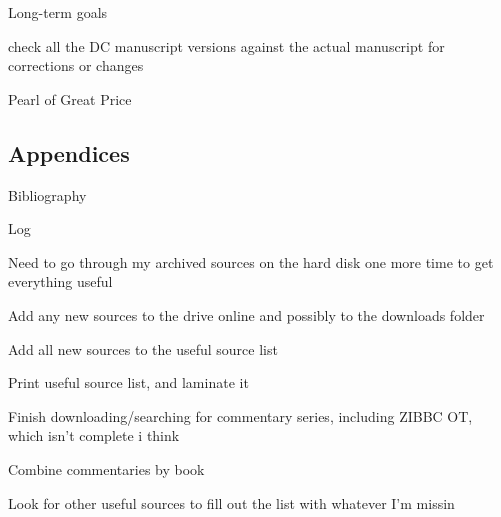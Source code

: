 \begin{compactitem}
\begin{compactitem}
\begin{compactitem}
						\end{compactitem}
				
					\item Long-term goals
						\begin{compactitem}
							\item check all the DC manuscript versions against the actual manuscript for corrections or changes
						\end{compactitem} 
					
				\end{compactitem}
				
			\item Pearl of Great Price
				\begin{compactitem}
					\item 
				\end{compactitem}
			
		\end{compactitem}
		
	\subsection{Appendices}
	
		\begin{compactitem}
		
			\item Bibliography
				\begin{compactitem}
					
					\item Log
						\begin{compactitem}
							\item Need to go through my archived sources on the hard disk one more time to get everything useful
							\item Add any new sources to the drive online and possibly to the downloads folder
							\item Add all new sources to the useful source list
							\item Print useful source list, and laminate it
							\item Finish downloading/searching for commentary series, including ZIBBC OT, which isn't complete i think
							\item Combine commentaries by book
							\item Look for other useful sources to fill out the list with whatever I'm missin
						\end{compactitem}
					
				\end{compactitem}
		
		\end{compactitem}